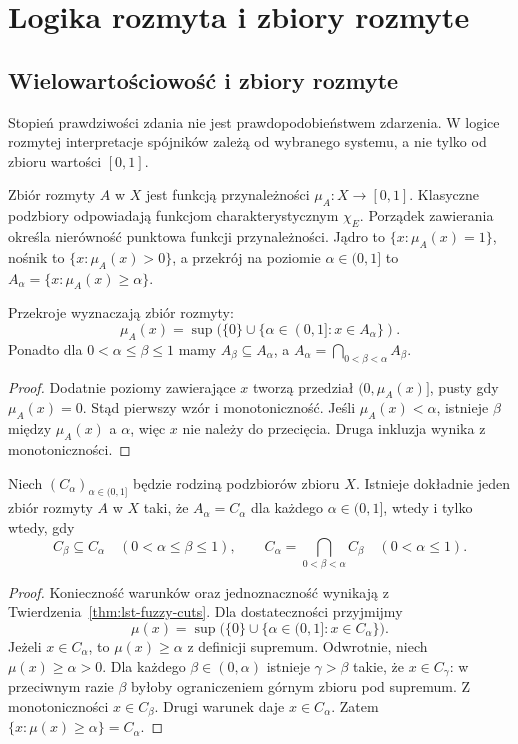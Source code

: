 \chapter{Logika rozmyta i zbiory rozmyte}\label{ch:lst-fuzzy-logic}

\section{Wielowartościowość i zbiory rozmyte}
Stopień prawdziwości zdania nie jest prawdopodobieństwem zdarzenia.
W logice rozmytej interpretacje spójników zależą od wybranego systemu,
a nie tylko od zbioru wartości $[0,1]$.
\begin{definicja}\label{def:lst-fuzzy-set}
Zbiór rozmyty $A$ w $X$ jest funkcją przynależności $\mu_A:X\to[0,1]$.
Klasyczne podzbiory odpowiadają funkcjom charakterystycznym $\chi_E$.
Porządek zawierania określa nierówność punktowa funkcji przynależności.
Jądro to $\{x:\mu_A(x)=1\}$, nośnik to $\{x:\mu_A(x)>0\}$, a
przekrój na poziomie $\alpha\in(0,1]$ to $A_\alpha=\{x:\mu_A(x)\geq\alpha\}$.
\end{definicja}
\begin{twierdzenie}\label{thm:lst-fuzzy-cuts}
Przekroje wyznaczają zbiór rozmyty:
\[
\mu_A(x)=\sup(\{0\}\cup\{\alpha\in(0,1]:x\in A_\alpha\}).
\]
Ponadto dla $0<\alpha\leq\beta\leq1$ mamy $A_\beta\subseteq A_\alpha$,
a $A_\alpha=\bigcap_{0<\beta<\alpha}A_\beta$.
\end{twierdzenie}
\begin{proof}
Dodatnie poziomy zawierające $x$ tworzą przedział $(0,\mu_A(x)]$,
pusty gdy $\mu_A(x)=0$. Stąd pierwszy wzór i monotoniczność.
Jeśli $\mu_A(x)<\alpha$, istnieje $\beta$ między $\mu_A(x)$ a $\alpha$,
więc $x$ nie należy do przecięcia. Druga inkluzja wynika z monotoniczności.
\end{proof}
\begin{twierdzenie}
\label{thm:ncl-cut-characterization}
Niech $(C_\alpha)_{\alpha\in(0,1]}$ będzie rodziną podzbiorów
zbioru $X$. Istnieje dokładnie jeden zbiór rozmyty $A$ w $X$
taki, że $A_\alpha=C_\alpha$ dla każdego $\alpha\in(0,1]$,
wtedy i tylko wtedy, gdy
\[
  C_\beta\subseteq C_\alpha\quad(0<\alpha\leq\beta\leq1),
  \qquad
  C_\alpha=\bigcap_{0<\beta<\alpha} C_\beta
  \quad(0<\alpha\leq1).
\]
\end{twierdzenie}
\begin{proof}
Konieczność warunków oraz jednoznaczność wynikają z
Twierdzenia~\ref{thm:lst-fuzzy-cuts}. Dla dostateczności
przyjmijmy
\[
 \mu(x)=\sup\bigl(\{0\}\cup\{\alpha\in(0,1]:x\in C_\alpha\}\bigr).
\]
Jeżeli $x\in C_\alpha$, to $\mu(x)\geq\alpha$ z definicji
supremum. Odwrotnie, niech $\mu(x)\geq\alpha>0$.
Dla każdego $\beta\in(0,\alpha)$ istnieje $\gamma>\beta$
takie, że $x\in C_\gamma$: w przeciwnym razie $\beta$
byłoby ograniczeniem górnym zbioru pod supremum.
Z monotoniczności $x\in C_\beta$. Drugi warunek daje
$x\in C_\alpha$. Zatem $\{x:\mu(x)\geq\alpha\}=C_\alpha$.
\end{proof}

